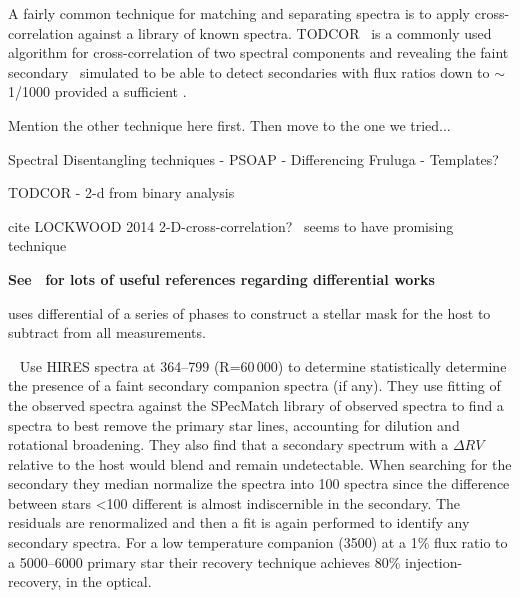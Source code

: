 

A fairly common technique for matching and separating spectra is to apply cross-correlation against a library of known spectra.
TODCOR~\citep{zucker_study_1994} is a commonly used algorithm for cross-correlation of two spectral components and revealing the faint secondary~\citep[e.g.][]{mazeh_detecting_1997} simulated to be able to detect secondaries with flux ratios down to \(\sim\)1/1000 provided a sufficient \snr{}\citep{mazeh_todcor_1994}.

Mention the other technique here first.
Then move to the one we tried...

Spectral Disentangling techniques
- PSOAP \citet{czekala_disentangling_2017} 
- Differencing Fruluga
- Templates?

TODCOR - 2-d from binary analysis~\citep{zucker_study_1994}
\citep{mazeh_detecting_1997}


cite {LOCKWOOD 2014}
2-D-cross-correlation?~\citet{piskorz_evidence_2016} seems to have promising technique


\textbf{
    See~\citet{kostogryz_spectral_2013} for lots of useful references regarding differential works~\citet{simon_disentangling_1994}}

\citet{rodler_weighing_2012} uses differential of a series of phases to construct a stellar mask for the host to subtract from all measurements.


{\red{}~\citet{kolbl_detection_2015} Use HIRES spectra at 364--799\nm{} (R=60\,000) to determine statistically determine the presence of a faint secondary companion spectra (if any).
    They use \textchisquared{} fitting of the observed spectra against the {SPecMatch} library of observed spectra to find a spectra to best remove the primary star lines,
    accounting for dilution and rotational broadening.
    They also find that a secondary spectrum with a \(\Delta {RV}\) relative to the host would blend and remain undetectable.
    When searching for the secondary they median normalize the spectra into 100\K{} spectra since the difference between stars  <100\K{} different is almost indiscernible in the secondary.
    The residuals are renormalized and then a \textchisquared{} fit is again performed to identify any secondary spectra.
    For a low temperature companion (3500\K{}) at a 1\% flux ratio to a 5000--6000\K{} primary star their recovery technique achieves 80\% injection-recovery, in the optical.}

